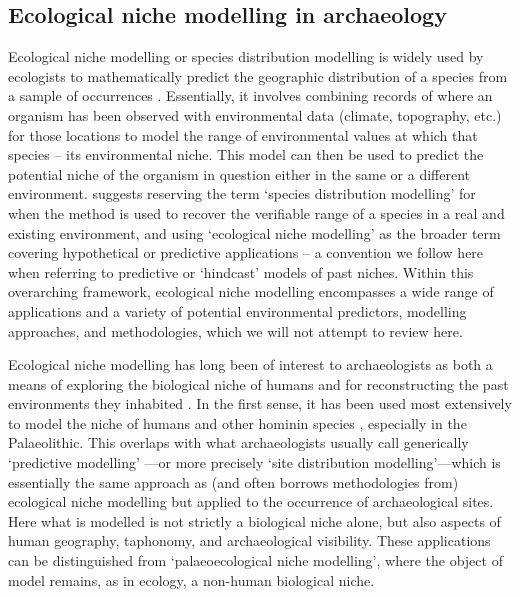 \documentclass[
  authoryear,
  preprint]{elsarticle}
\begin{document}
\subsection{Ecological niche modelling in
archaeology}\label{ecological-niche-modelling-in-archaeology}

Ecological niche modelling or species distribution modelling is widely
used by ecologists to mathematically predict the geographic distribution
of a species from a sample of occurrences
\citep{FranklinMiller2009, SilleroEtAl2021}. Essentially, it involves
combining records of where an organism has been observed with
environmental data (climate, topography, etc.) for those locations to
model the range of environmental values at which that species -- its
environmental niche. This model can then be used to predict the
potential niche of the organism in question either in the same or a
different environment. \citet{TownsendPetersonSoberon2012} suggests
reserving the term `species distribution modelling' for when the method
is used to recover the verifiable range of a species in a real and
existing environment, and using `ecological niche modelling' as the
broader term covering hypothetical or predictive applications -- a
convention we follow here when referring to predictive or `hindcast'
models of past niches. Within this overarching framework, ecological
niche modelling encompasses a wide range of applications and a variety
of potential environmental predictors, modelling approaches, and
methodologies, which we will not attempt to review here.

Ecological niche modelling has long been of interest to archaeologists
as both a means of exploring the biological niche of humans and for
reconstructing the past environments they inhabited
\citep{DavidPollyEronen2011, FranklinEtAl2015}. In the first sense, it
has been used most extensively to model the niche of humans and other
hominin species
\citep[e.g.][]{BenitoEtAl2017, YousefiEtAl2020, BanksEtAl2021, YaworskyEtAl2024a, YaworskyEtAl2024b, GuranEtAl2024},
especially in the Palaeolithic. This overlaps with what archaeologists
usually call generically `predictive modelling'
\citep{VerhagenWhitley2020}---or more precisely `site distribution
modelling'---which is essentially the same approach as (and often
borrows methodologies from) ecological niche modelling but applied to
the occurrence of archaeological sites. Here what is modelled is not
strictly a biological niche alone, but also aspects of human geography,
taphonomy, and archaeological visibility. These applications can be
distinguished from `palaeoecological niche modelling', where the object
of model remains, as in ecology, a non-human biological niche.
\end{document}
